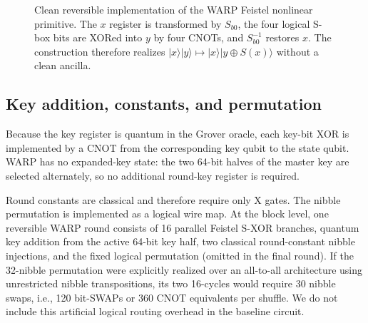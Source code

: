 \documentclass[10pt,a4paper]{article}
\providecommand{\ket}[1]{\lvert #1\rangle}
\newcommand{\Sb}{S_{b0}}
\begin{document}
\begin{figure}[tbp]
\centering
{}
\caption{Clean reversible implementation of the WARP Feistel nonlinear primitive. The $x$ register is transformed by $\Sb$, the four logical S-box bits are XORed into $y$ by four CNOTs, and $\Sb^{-1}$ restores $x$. The construction therefore realizes $\ket{x}\ket{y}\mapsto\ket{x}\ket{y\oplus S(x)}$ without a clean ancilla.}
\label{fig:sxor_circuit}
\end{figure}

\subsection{Key addition, constants, and permutation}
Because the key register is quantum in the Grover oracle, each key-bit XOR is implemented by a CNOT from the corresponding key qubit to the state qubit. WARP has no expanded-key state: the two 64-bit halves of the master key are selected alternately, so no additional round-key register is required.

Round constants are classical and therefore require only X gates. The nibble permutation is implemented as a logical wire map. At the block level, one reversible WARP round consists of 16 parallel Feistel S-XOR branches, quantum key addition from the active 64-bit key half, two classical round-constant nibble injections, and the fixed logical permutation (omitted in the final round). If the 32-nibble permutation were explicitly realized over an all-to-all architecture using unrestricted nibble transpositions, its two 16-cycles would require 30 nibble swaps, i.e., 120 bit-SWAPs or 360 CNOT equivalents per shuffle. We do not include this artificial logical routing overhead in the baseline circuit.
\end{document}
